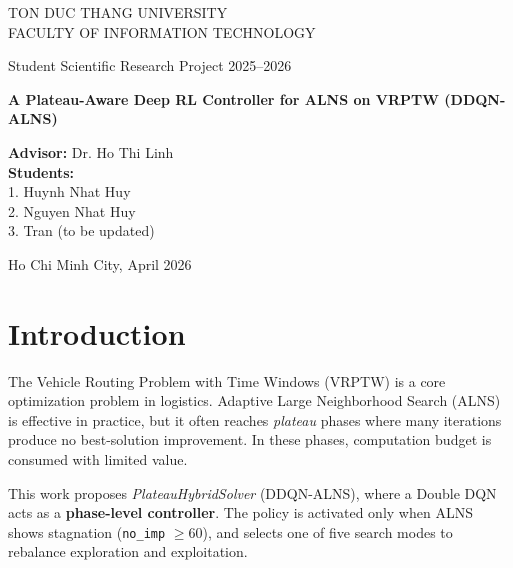 \documentclass[13pt, a4paper]{extarticle}
\begin{document}
\begin{titlepage}
    \thispagestyle{empty}
    \begin{center}
        TON DUC THANG UNIVERSITY \\
        FACULTY OF INFORMATION TECHNOLOGY \\
        \vspace{2.2cm}

        Student Scientific Research Project 2025--2026 \\
        \vspace{1.4cm}

        \textbf{\Large A Plateau-Aware Deep RL Controller for ALNS on VRPTW (DDQN-ALNS)} \\
        \vspace{2cm}
    \end{center}

    \begin{flushleft}
        \textbf{Advisor:} Dr. Ho Thi Linh \\
        \vspace{0.8cm}
        \textbf{Students:} \\
        1. Huynh Nhat Huy \\
        2. Nguyen Nhat Huy \\
        3. Tran (to be updated)
    \end{flushleft}

    \vfill
    \begin{center}
        Ho Chi Minh City, April 2026
    \end{center}
\end{titlepage}

\newpage
\setcounter{page}{1}

\section*{Introduction}
The Vehicle Routing Problem with Time Windows (VRPTW) is a core optimization problem in logistics. Adaptive Large Neighborhood Search (ALNS) is effective in practice, but it often reaches \textit{plateau} phases where many iterations produce no best-solution improvement. In these phases, computation budget is consumed with limited value.

This work proposes \textit{PlateauHybridSolver} (DDQN-ALNS), where a Double DQN acts as a \textbf{phase-level controller}. The policy is activated only when ALNS shows stagnation (\texttt{no\_imp} $\ge 60$), and selects one of five search modes to rebalance exploration and exploitation.
\end{document}
